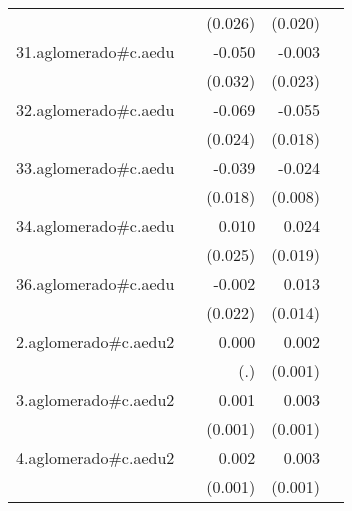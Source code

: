 {\begin{longtable}{l*{4}{D{.}{.}{-1}}}
            &                     &     (0.026)         &     (0.020)         &                     \\
\addlinespace
31.aglomerado#c.aedu&                     &      -0.050         &      -0.003         &                     \\
            &                     &     (0.032)         &     (0.023)         &                     \\
\addlinespace
32.aglomerado#c.aedu&                     &      -0.069\sym{**} &      -0.055\sym{**} &                     \\
            &                     &     (0.024)         &     (0.018)         &                     \\
\addlinespace
33.aglomerado#c.aedu&                     &      -0.039\sym{*}  &      -0.024\sym{**} &                     \\
            &                     &     (0.018)         &     (0.008)         &                     \\
\addlinespace
34.aglomerado#c.aedu&                     &       0.010         &       0.024         &                     \\
            &                     &     (0.025)         &     (0.019)         &                     \\
\addlinespace
36.aglomerado#c.aedu&                     &      -0.002         &       0.013         &                     \\
            &                     &     (0.022)         &     (0.014)         &                     \\
\addlinespace
2.aglomerado#c.aedu2&                     &       0.000         &       0.002\sym{**} &                     \\
            &                     &         (.)         &     (0.001)         &                     \\
\addlinespace
3.aglomerado#c.aedu2&                     &       0.001         &       0.003\sym{***}&                     \\
            &                     &     (0.001)         &     (0.001)         &                     \\
\addlinespace
4.aglomerado#c.aedu2&                     &       0.002         &       0.003\sym{***}&                     \\
            &                     &     (0.001)         &     (0.001)         &                     \\

\end{longtable}}
